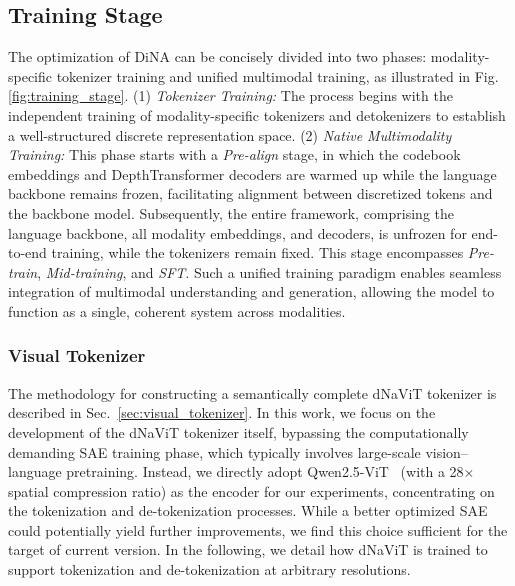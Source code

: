 \documentclass{article}
\begin{document}
\subsection{Training Stage}

The optimization of DiNA can be concisely divided into two phases: modality-specific tokenizer training and unified multimodal training, as illustrated in Fig.\ref{fig:training_stage}. (1) \textit{Tokenizer Training:} The process begins with the independent training of modality-specific tokenizers and detokenizers to establish a well-structured discrete representation space. (2) \textit{Native Multimodality Training:} This phase starts with a \textit{Pre-align} stage, in which the codebook embeddings and DepthTransformer decoders are warmed up while the language backbone remains frozen, facilitating alignment between discretized tokens and the backbone model. Subsequently, the entire framework, comprising the language backbone, all modality embeddings, and decoders, is unfrozen for end-to-end training, while the tokenizers remain fixed. This stage encompasses \textit{Pre-train}, \textit{Mid-training}, and \textit{SFT}. Such a unified training paradigm enables seamless integration of multimodal understanding and generation, allowing the model to function as a single, coherent system across modalities.

\subsubsection{Visual Tokenizer}

The methodology for constructing a semantically complete dNaViT tokenizer is described in Sec.~\ref{sec:visual_tokenizer}. In this work, we focus on the development of the dNaViT tokenizer itself, bypassing the computationally demanding SAE training phase, which typically involves large-scale vision–language pretraining. Instead, we directly adopt Qwen2.5-ViT~\cite{qwenvl} (with a 28× spatial compression ratio) as the encoder for our experiments, concentrating on the tokenization and de-tokenization processes. While a better optimized SAE could potentially yield further improvements, we find this choice sufficient for the target of current version. In the following, we detail how dNaViT is trained to support tokenization and de-tokenization at arbitrary resolutions.
\end{document}

